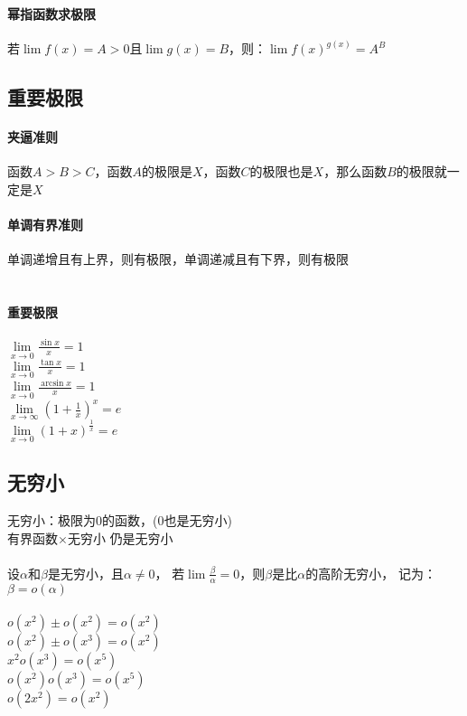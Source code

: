 \documentclass{article}
\begin{document}
\begin{flushleft}
\paragraph{幂指函数求极限}
若$\lim f(x)=A>0$且$\lim g(x)=B$，则：$\lim f(x)^{g(x)}=A^B$\\

\subsection{重要极限}

\paragraph{夹逼准则}
函数$A>B>C$，函数$A$的极限是$X$，函数$C$的极限也是$X$，那么函数$B$的极限就一定是$X$\\
\paragraph{单调有界准则}
单调递增且有上界，则有极限，单调递减且有下界，则有极限\\
~\\
\paragraph{重要极限}
$\lim\limits_{x\to 0} \frac{\sin x}{x}=1$\\
$\lim\limits_{x\to 0} \frac{\tan x}{x}=1$\\
$\lim\limits_{x\to 0} \frac{\arcsin x}{x}=1$\\
$\lim\limits_{x\to \infty} (1+\frac{1}{x})^x=e$\\
$\lim\limits_{x\to 0} (1+x)^{\frac{1}{x}}=e$\\

\subsection{无穷小}

无穷小：极限为0的函数，(0也是无穷小)\\
有界函数$\times$无穷小 仍是无穷小\\
~\\
设$\alpha$和$\beta$是无穷小，且$\alpha \neq 0$，
若$\lim \frac{\beta}{\alpha}=0$，则$\beta$是比$\alpha$的高阶无穷小，
记为：$\beta = o(\alpha)$\\
~\\
$o(x^2)\pm o(x^2)=o(x^2)$\\
$o(x^2)\pm o(x^3)=o(x^2)$\\
$x^2 o(x^3)=o(x^5)$\\
$o(x^2) o(x^3)=o(x^5)$\\
$o(2x^2)=o(x^2)$\\


\end{flushleft}
\end{document}
